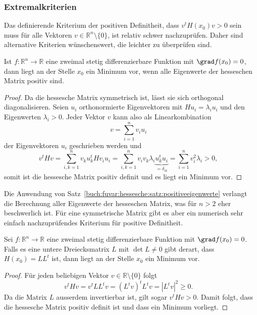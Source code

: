 %
%
\subsubsection{Extremalkriterien}
Das definierende Kriterium der positiven Definitheit, dass $v^tH(x_0)v>0$
sein muss für alle Vektoren $v\in\mathbb{R}^n\setminus\{0\}$, ist
relativ schwer nachzuprüfen.
Daher sind alternative Kriterien wünschenswert, die leichter zu überprüfen
sind.

\begin{satz}
\label{buch:fuvar:hessesche:satz:positiveeigenwerte}
Ist $f\colon\mathbb{R}^n\to\mathbb{R}$ eine zweimal stetig differenzierbare
Funktion mit $\grad f(x_0)=0$, dann liegt an der Stelle $x_0$ ein Minimum
vor, wenn alle Eigenwerte der hesseschen Matrix positiv sind.
\end{satz}

\begin{proof}
Da die hessesche Matrix symmetrisch ist, lässt sie sich orthogonal
diagonalisieren.
Seien $u_i$ orthonormierte Eigenvektoren mit $Hu_i=\lambda_iu_i$ und
den Eigenwerten $\lambda_i>0$.
Jeder Vektor $v$ kann also als Linearkombination
\[
v = \sum_{i=1}^n v_iu_i
\]
der Eigenvektoren $u_i$ geschrieben werden und 
\[
v^tHv
=
\sum_{i,k=1}^n
v_ku_k^t
Hv_iu_i
=
\sum_{i,k=1}^n v_iv_k\lambda_i \underbrace{u_k^tu_i}_{\displaystyle=\delta_{ik}}
=
\sum_{i=1}^{n} v_i^2\lambda_i > 0,
\]
somit ist die hessesche Matrix positiv definit und es liegt ein
Minimum vor.
\end{proof}

Die Anwendung von Satz~\ref{buch:fuvar:hessesche:satz:positiveeigenwerte}
verlangt die Berechnung aller Eigenwerte der hesseschen Matrix, was für
$n>2$ eher beschwerlich ist.
Für eine symmetrische Matrix gibt es aber ein numerisch sehr einfach
nachzuprüfendes Kriterium für positive Definitheit.

\begin{satz}
Sei $f\colon\mathbb{R}^n\to\mathbb{R}$ eine zweimal stetig differenzierbare
Funktion mit $\grad f(x_0)=0$.
Falls es eine untere Dreiecksmatrix $L$ mit $\det L\ne 0$ gibt derart,
dass $H(x_0)=LL^t$ ist, dann liegt an der Stelle $x_0$ ein Minimum vor.
\end{satz}

\begin{proof}
Für jeden beliebigen Vektor $v\in\mathbb{R}\setminus\{0\}$ folgt
\[
v^tHv
=
v^tLL^tv
=
(L^tv)^t L^tv
=
|L^tv|^2
\ge
0.
\]
Da die Matrix $L$ ausserdem invertierbar ist, gilt sogar $v^tHv>0$.
Damit folgt, dass die hessesche Matrix positiv definit ist und dass
ein Minimum vorliegt.
\end{proof}


